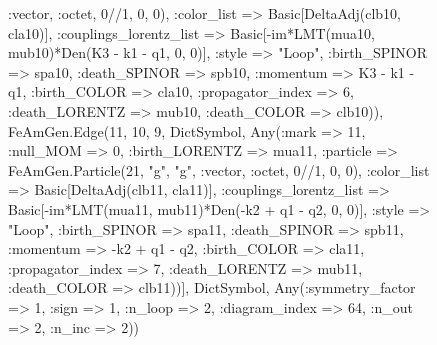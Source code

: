 \documentclass{revtex4}
\begin{document}
\begin{figure}[!htb]
\begin{center}
{:vector, :octet, 0//1, 0, 0), :color_list => Basic[DeltaAdj(clb10, cla10)], :couplings_lorentz_list => Basic[-im*LMT(mua10, mub10)*Den(K3 - k1 - q1, 0, 0)], :style => "Loop", :birth_SPINOR => spa10, :death_SPINOR => spb10, :momentum => K3 - k1 - q1, :birth_COLOR => cla10, :propagator_index => 6, :death_LORENTZ => mub10, :death_COLOR => clb10)), FeAmGen.Edge(11, 10, 9, Dict{Symbol, Any}(:mark => 11, :null_MOM => 0, :birth_LORENTZ => mua11, :particle => FeAmGen.Particle(21, "g", "g", :vector, :octet, 0//1, 0, 0), :color_list => Basic[DeltaAdj(clb11, cla11)], :couplings_lorentz_list => Basic[-im*LMT(mua11, mub11)*Den(-k2 + q1 - q2, 0, 0)], :style => "Loop", :birth_SPINOR => spa11, :death_SPINOR => spb11, :momentum => -k2 + q1 - q2, :birth_COLOR => cla11, :propagator_index => 7, :death_LORENTZ => mub11, :death_COLOR => clb11))], Dict{Symbol, Any}(:symmetry_factor => 1, :sign => 1, :n_loop => 2, :diagram_index => 64, :n_out => 2, :n_inc => 2)) 
}
\end{center}
\end{figure}
\end{document}
